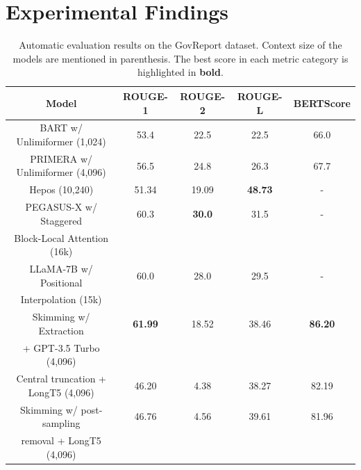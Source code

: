 \section{Experimental Findings}
\label{sec:findings}

\begin{table}[!ht]
	\centering

	\begin{tabular}{c c c c c}
		\hline
		\textbf{Model} & \textbf{ROUGE-1} & \textbf{ROUGE-2} & \textbf{ROUGE-L} &
		\textbf{BERTScore} \\
		\hline
		BART w/ Unlimiformer (1,024) & 53.4 & 22.5 & 22.5 & 66.0 \\
		PRIMERA w/ Unlimiformer (4,096) & 56.5 & 24.8 & 26.3 & 67.7 \\
		Hepos (10,240) & 51.34 & 19.09 & \textbf{48.73} & - \\
		PEGASUS-X w/ Staggered & 60.3 & \textbf{30.0} & 31.5 & - \\
		Block-Local Attention (16k) & & & & \\
		LLaMA-7B w/ Positional & 60.0 & 28.0 & 29.5 & - \\
		Interpolation (15k) & & & & \\
		\hline
		Skimming w/ Extraction & \textbf{61.99} & 18.52 & 38.46 & \textbf{86.20} \\
		+ GPT-3.5 Turbo (4,096) & & & & \\
		Central truncation + LongT5 (4,096) & 46.20 & 4.38 & 38.27 & 82.19 \\
		Skimming w/ post-sampling & 46.76 & 4.56 & 39.61 & 81.96 \\
		removal + LongT5 (4,096) & & & & \\
		\hline
	\end{tabular}

	\caption{Automatic evaluation results on the GovReport dataset. Context size of the models are
	mentioned in parenthesis. The best score in each metric category is highlighted in \textbf{bold}.}
	\label{tab:govreport}
\end{table}

